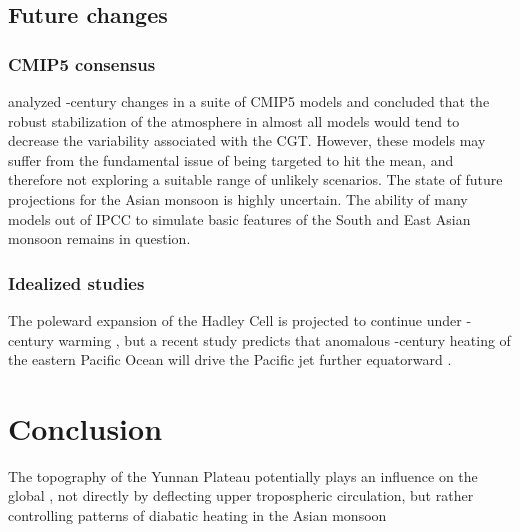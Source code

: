\subsection{Future changes}
\subsubsection{CMIP5 consensus}
	\citet{Lee2014} analyzed -century changes in a suite of CMIP5 models and concluded that the robust stabilization of the atmosphere in almost all models would tend to decrease the variability associated with the CGT. However, these models may suffer from the fundamental issue of being targeted to hit the mean, and therefore not exploring a suitable range of unlikely scenarios. The state of future projections for the Asian monsoon is highly uncertain. The ability of many models out of IPCC to simulate basic features of the South and East Asian monsoon remains in question.

\subsubsection{Idealized studies}
	The poleward expansion of the Hadley Cell is projected to continue under -century warming \citep{Frierson2007,Lu2007,Kang2012}, but a recent study predicts that anomalous -century heating of the eastern Pacific Ocean will drive the Pacific jet further equatorward \citep{Park2014}.
	
	

		 
\section{Conclusion}

	The topography of the Yunnan Plateau potentially plays an influence on the global , not directly by deflecting upper tropospheric circulation, but rather controlling patterns of diabatic heating in the Asian monsoon

